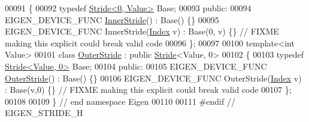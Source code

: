 \begin{DoxyCode}
00091 \{
00092     \textcolor{keyword}{typedef} \hyperlink{group___core___module}{Stride<0, Value>} Base;
00093   \textcolor{keyword}{public}:
00094     EIGEN\_DEVICE\_FUNC \hyperlink{class_eigen_1_1_inner_stride}{InnerStride}() : Base() \{\}
00095     EIGEN\_DEVICE\_FUNC InnerStride(\hyperlink{group___core___module_a96c2dfb0ce43fd8e19adcdf6094f5f63}{Index} v) : Base(0, v) \{\} \textcolor{comment}{// FIXME making this explicit could break
       valid code}
00096 \};
00097 
00100 \textcolor{keyword}{template}<\textcolor{keywordtype}{int} Value>
00101 \textcolor{keyword}{class }\hyperlink{class_eigen_1_1_outer_stride}{OuterStride} : \textcolor{keyword}{public} \hyperlink{group___core___module_class_eigen_1_1_stride}{Stride}<Value, 0>
00102 \{
00103     \textcolor{keyword}{typedef} \hyperlink{group___core___module}{Stride<Value, 0>} Base;
00104   \textcolor{keyword}{public}:
00105     EIGEN\_DEVICE\_FUNC \hyperlink{class_eigen_1_1_outer_stride}{OuterStride}() : Base() \{\}
00106     EIGEN\_DEVICE\_FUNC OuterStride(\hyperlink{group___core___module_a96c2dfb0ce43fd8e19adcdf6094f5f63}{Index} v) : Base(v,0) \{\} \textcolor{comment}{// FIXME making this explicit could break
       valid code}
00107 \};
00108 
00109 \} \textcolor{comment}{// end namespace Eigen}
00110 
00111 \textcolor{preprocessor}{#endif // EIGEN\_STRIDE\_H}
\end{DoxyCode}
